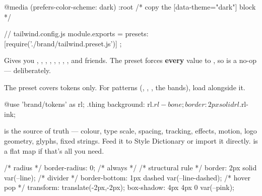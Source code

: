 \documentclass[fontpath=fonts/,logopath=logo/]{riposte-doc}
\begin{document}
\ripcodeopen
{}
\begin{ripcodeblock}
@media (prefers-color-scheme: dark) { :root { /* copy the [data-theme="dark"] block */ } }
\end{ripcodeblock}
\ripcodesizereset\ripcodeclose



\ripcodeopen
{}
\begin{ripcodeblock}
// tailwind.config.js
module.exports = { presets: [require('./brand/tailwind.preset.js')] };
\end{ripcodeblock}
\ripcodesizereset\ripcodeclose

Gives you , , , , , , , , and friends. The preset forces \textbf{every}  value to , so  is a no-op — deliberately.

The preset covers tokens only. For patterns (, , , the bands), load  alongside it.



\ripcodeopen
{}
\begin{ripcodeblock}
@use 'brand/tokens' as rl;
.thing { background: rl.$rl-bone; border: 2px solid rl.$rl-ink; }
\end{ripcodeblock}
\ripcodesizereset\ripcodeclose



 is the source of truth — colour, type scale, spacing, tracking, effects, motion, logo geometry, glyphs, fixed strings. Feed it to Style Dictionary or import it directly.  is a flat  map if that's all you need.



\ripcodeopen
{}
\begin{ripcodeblock}
/* radius */          border-radius: 0;            /* always */
/* structural rule */ border: 2px solid var(--line);
/* divider */         border-bottom: 1px dashed var(--line-dashed);
/* hover pop */       transform: translate(-2px,-2px); box-shadow: 4px 4px 0 var(--pink);
\end{ripcodeblock}
\ripcodesizereset\ripcodeclose
\end{document}

